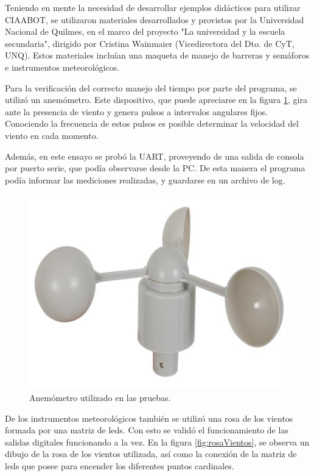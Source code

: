 Teniendo en mente la necesidad de desarrollar ejemplos didácticos para utilizar CIAABOT, se utilizaron materiales desarrollados y provistos por la Universidad Nacional de Quilmes, en el marco del proyecto "La universidad y la escuela secundaria", dirigido por Cristina Wainmaier (Vicedirectora del Dto. de CyT, UNQ). Estos materiales incluían una maqueta de manejo de barreras y semáforos e instrumentos meteorológicos.

Para la verificación del correcto manejo del tiempo por parte del programa, se utilizó un anemómetro. Este dispositivo, que puede apreciarse en la figura \ref{fig:anemometro}, gira ante la presencia de viento y genera pulsos a intervalos angulares fijos. Conociendo la frecuencia de estos pulsos es posible determinar la velocidad del viento en cada momento.

Además, en este ensayo se probó la UART, proveyendo de una salida de consola por puerto serie, que podía observarse desde la PC. De esta manera el programa podía informar las mediciones realizadas, y guardarse en un archivo de log.

\begin{figure}[h]
\centering
\includegraphics[scale=.8]{./Figures/anemometro.jpg}
\caption{Anemómetro utilizado en las pruebas.}
\label{fig:anemometro}
\end{figure}

De los instrumentos meteorológicos también se utilizó una rosa de los vientos formada por una matriz de leds. Con esto se validó el funcionamiento de las salidas digitales funcionando a la vez. En la figura \ref{fig:rosaVientos}, se observa un dibujo de la rosa de los vientos utilizada, así como la conexión de la matriz de leds que posee para encender los diferentes puntos cardinales.

